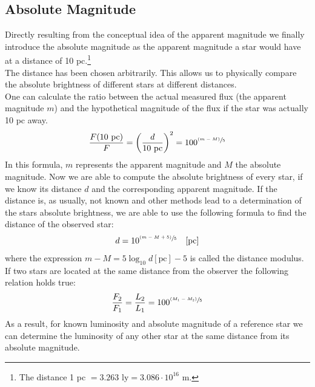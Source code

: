 \subsection{Absolute Magnitude}
Directly resulting from the conceptual idea of the apparent magnitude we finally introduce the absolute magnitude as the apparent magnitude a star would have at a distance of 10 pc.\footnote{The distance 1 pc $= 3.263 \text{ ly} = 3.086 \cdot 10^{16}$ m.}\\
The distance has been chosen arbitrarily. This allows us to physically compare the absolute brightness of different stars at different distances. \\
One can calculate the ratio between the actual measured flux (the apparent magnitude $m$) and the hypothetical magnitude of the flux if the star was actually 10 pc away. 
\begin{align}
	\frac{F(10 \text{ pc})}{F} = \left( \frac{d}{10 \text{ pc}} \right)^2 = 100^{\sfrac{(m-M)}{5}}
\end{align}
In this formula, $m$ represents the apparent magnitude and $M$ the absolute magnitude. Now we are able to compute the absolute brightness of every star, if we know its distance $d$ and the corresponding apparent magnitude. If the distance is, as usually, not known and other methods lead to a determination of the stars absolute brightness, we are able to use the following formula to find the distance of the observed star:
\begin{align}
	d = 10^{\sfrac{(m-M+5)}{5}} \quad [\text{pc}]
\end{align}
where the expression $m-M = 5\operatorname{log}_{10} d[\text{pc}] - 5$ is called the distance modulus. \\
If two stars are located at the same distance from the observer the following relation holds true: 
\begin{align}
	\frac{F_2}{F_1} = \frac{L_2}{L_1} = 100^{\sfrac{(M_1-M_2)}{5}}
\end{align}
As a result, for known luminosity and absolute magnitude of a reference star we can determine the luminosity of any other star at the same distance from its absolute magnitude.
